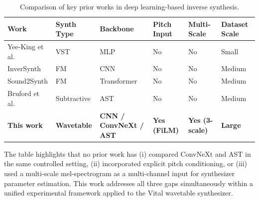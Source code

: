 \begin{table}[H]
\centering
\renewcommand{\arraystretch}{1.3}
\begin{tabular}{p{3.2cm} p{2cm} p{1.8cm} p{1.6cm} p{1.8cm} p{2.5cm}}
\hline
\textbf{Work} & \textbf{Synth Type} & \textbf{Backbone} & \textbf{Pitch Input} & \textbf{Multi-Scale} & \textbf{Dataset Scale} \\
\hline
Yee-King et al. \cite{yeeking2018automatic} & VST & MLP & No & No & Small \\
InverSynth \cite{barkan2019inversynth} & FM & CNN & No & No & Medium \\
Sound2Synth \cite{chen2022sound2synth} & FM & Transformer & No & No & Medium \\
Bruford et al. \cite{bruford2024ast} & Subtractive & AST & No & No & Medium \\
\textbf{This work} & \textbf{Wavetable} & \textbf{CNN / ConvNeXt / AST} & \textbf{Yes (FiLM)} & \textbf{Yes (3-scale)} & \textbf{Large} \\
\hline
\end{tabular}
\vspace{0.3cm}
\caption{Comparison of key prior works in deep learning-based inverse synthesis.}
\label{tab:litreview_summary}
\end{table}

\noindent The table highlights that no prior work has (i) compared ConvNeXt and AST in the same controlled setting, (ii) incorporated explicit pitch conditioning, or (iii) used a multi-scale mel-spectrogram as a multi-channel input for synthesizer parameter estimation. This work addresses all three gaps simultaneously within a unified experimental framework applied to the Vital wavetable synthesizer.
